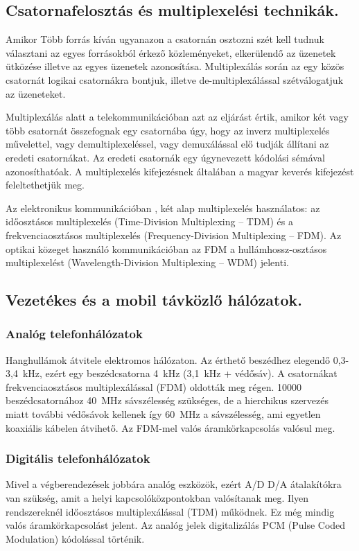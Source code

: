\subsection{Csatornafelosztás és multiplexelési technikák.}
Amikor Több forrás kíván ugyanazon a csatornán osztozni szét kell tudnuk választani az egyes forrásokból érkező közleményeket, elkerülendő az üzenetek ütközése illetve az egyes üzenetek azonosítása. Multiplexálás során az egy közös csatornát logikai csatornákra bontjuk, illetve de-multiplexálással szétválogatjuk az üzeneteket.

Multiplexálás alatt a telekommunikációban azt az eljárást értik, amikor két vagy
több csatornát összefognak egy csatornába úgy, hogy az inverz multiplexelés művelettel, vagy demultiplexeléssel, vagy demuxálással elő tudják állítani az eredeti csatornákat. Az eredeti csatornák egy úgynevezett kódolási sémával azonosíthatóak. A multiplexelés kifejezésnek általában a magyar keverés kifejezést feleltethetjük meg. 

Az elektronikus kommunikációban , két alap multiplexelés használatos: az időosztásos multiplexelés (Time-Division Multiplexing -- TDM) és a frekvenciaosztásos multiplexelés (Frequency-Division Multiplexing -- FDM). Az
optikai közeget használó kommunikációban az FDM a hullámhossz-osztásos multiplexelést (Wavelength-Division Multiplexing -- WDM) jelenti.


\subsection{Vezetékes és a mobil távközlő hálózatok.}
\subsubsection{Analóg telefonhálózatok}
Hanghullámok átvitele elektromos hálózaton. Az érthető beszédhez elegendő 0,3-3,4~kHz, ezért egy beszédcsatorna 4~kHz (3,1~kHz + védősáv). A csatornákat frekvenciaosztásos multiplexálással (FDM) oldották meg régen. 10000 beszédcsatornához 40~MHz sávszélesség szükséges, de a hierchikus szervezés miatt további védősávok kellenek így 60~MHz a sávszélesség, ami egyetlen koaxiális kábelen átvihető. Az FDM-mel valós áramkörkapcsolás valósul meg.

\subsubsection{Digitális telefonhálózatok}
Mivel a végberendezések jobbára analóg eszközök, ezért A/D D/A átalakítókra van szükség, amit a helyi kapcsolóközpontokban valósítanak meg. Ilyen rendszereknél időosztásos multiplexálással (TDM) működnek. Ez még mindig valós áramkörkapcsolást jelent. Az analóg jelek digitalizálás PCM (Pulse Coded Modulation) kódolással történik.


